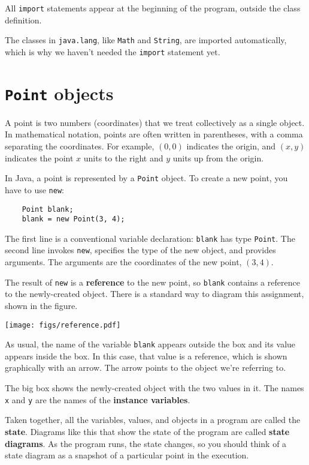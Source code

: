 \documentclass[12pt]{book}
\theoremstyle{definition}
\begin{document}
All {\tt import} statements appear at the beginning of the program,
outside the class definition.

The classes in {\tt java.lang}, like {\tt Math} and {\tt String}, are
imported automatically, which is why we haven't needed the
{\tt import} statement yet.


\section{{\tt Point} objects}

A point is two numbers (coordinates)
that we treat collectively as a single object.  In mathematical
notation, points are often written in parentheses, with a comma
separating the coordinates.  For example, $(0, 0)$ indicates
the origin, and $(x, y)$ indicates the point $x$ units to the
right and $y$ units up from the origin.


In Java, a point is represented by a {\tt Point} object.  To
create a new point, you have to use {\tt new}:

\begin{lstlisting}
    Point blank;
    blank = new Point(3, 4);
\end{lstlisting}
% 
The first line is a conventional variable declaration: {\tt blank}
has type {\tt Point}.  The second line invokes {\tt new}, specifies
the type of the new object, and provides arguments.  The arguments are
the coordinates of the new point, $(3, 4)$.


The result of {\tt new} is a {\bf reference} to the new
point, so {\tt blank} contains a reference to the
newly-created object.  There is a standard way to diagram this
assignment, shown in the figure.


\texttt{[image: figs/reference.pdf]}


As usual, the name of the variable {\tt blank} appears outside the box
and its value appears inside the box.  In this case, that value is a
reference, which is shown graphically with an arrow.  The
arrow points to the object we're referring to.

The big box shows the newly-created object with the two values
in it.  The names {\tt x} and {\tt y} are the names of the {\bf
instance variables}.

Taken together, all the variables, values, and objects in a
program are called the {\bf state}.  Diagrams like this that
show the state of the program are called {\bf state diagrams}.
As the program runs, the state changes, so you should think
of a state diagram as a snapshot of a particular point in the
execution.
\end{document}
